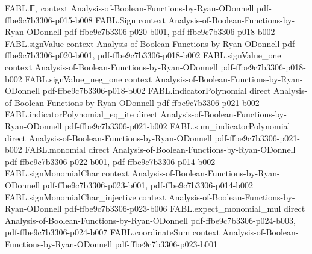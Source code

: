 \begin{theorem}
\label{FABL.sigma_sq_mul_biasedOutputPivotalProbability_eq_mass_mul_influence_of_monotone}
\leanok
{}
\proofstep
  {FABL.𝔽₂}
  {context}
  {Analysis-of-Boolean-Functions-by-Ryan-ODonnell}
  {pdf-ffbe9c7b3306-p015-b008}
\proofstep
  {FABL.Sign}
  {context}
  {Analysis-of-Boolean-Functions-by-Ryan-ODonnell}
  {pdf-ffbe9c7b3306-p020-b001,
    pdf-ffbe9c7b3306-p018-b002}
\proofstep
  {FABL.signValue}
  {context}
  {Analysis-of-Boolean-Functions-by-Ryan-ODonnell}
  {pdf-ffbe9c7b3306-p020-b001,
    pdf-ffbe9c7b3306-p018-b002}
\proofstep
  {FABL.signValue_one}
  {context}
  {Analysis-of-Boolean-Functions-by-Ryan-ODonnell}
  {pdf-ffbe9c7b3306-p018-b002}
\proofstep
  {FABL.signValue_neg_one}
  {context}
  {Analysis-of-Boolean-Functions-by-Ryan-ODonnell}
  {pdf-ffbe9c7b3306-p018-b002}
\proofstep
  {FABL.indicatorPolynomial}
  {direct}
  {Analysis-of-Boolean-Functions-by-Ryan-ODonnell}
  {pdf-ffbe9c7b3306-p021-b002}
\proofstep
  {FABL.indicatorPolynomial_eq_ite}
  {direct}
  {Analysis-of-Boolean-Functions-by-Ryan-ODonnell}
  {pdf-ffbe9c7b3306-p021-b002}
\proofstep
  {FABL.sum_indicatorPolynomial}
  {direct}
  {Analysis-of-Boolean-Functions-by-Ryan-ODonnell}
  {pdf-ffbe9c7b3306-p021-b002}
\proofstep
  {FABL.monomial}
  {direct}
  {Analysis-of-Boolean-Functions-by-Ryan-ODonnell}
  {pdf-ffbe9c7b3306-p022-b001,
    pdf-ffbe9c7b3306-p014-b002}
\proofstep
  {FABL.signMonomialChar}
  {context}
  {Analysis-of-Boolean-Functions-by-Ryan-ODonnell}
  {pdf-ffbe9c7b3306-p023-b001,
    pdf-ffbe9c7b3306-p014-b002}
\proofstep
  {FABL.signMonomialChar_injective}
  {context}
  {Analysis-of-Boolean-Functions-by-Ryan-ODonnell}
  {pdf-ffbe9c7b3306-p023-b006}
\proofstep
  {FABL.expect_monomial_mul}
  {direct}
  {Analysis-of-Boolean-Functions-by-Ryan-ODonnell}
  {pdf-ffbe9c7b3306-p024-b003,
    pdf-ffbe9c7b3306-p024-b007}
\proofstep
  {FABL.coordinateSum}
  {context}
  {Analysis-of-Boolean-Functions-by-Ryan-ODonnell}
  {pdf-ffbe9c7b3306-p023-b001}

\end{theorem}
